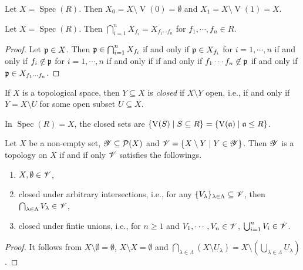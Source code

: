 \begin{fact}
    Let $X = \operatorname{Spec}(R)$. Then $X_0 = X \setminus \operatorname{V}(0) = \emptyset$ and $X_1 = X \setminus \operatorname{V}(1) = X$.
\end{fact}

\begin{proposition}
    Let $X = \operatorname{Spec}(R)$. Then $\bigcap_{i=1}^n X_{f_i} = X_{f_1 \cdots f_n}$ for $f_1,\cdots,f_n \in R$.
\end{proposition}

\begin{proof}
    Let $\mathfrak{p} \in X$. Then $\mathfrak{p} \in \bigcap_{i=1}^n X_{f_i}$ if and only if $\mathfrak{p} \in X_{f_i}$ for $i = 1,\cdots,n$ if and only if $f_i \not \in \mathfrak{p}$ for $i = 1,\cdots,n$ if and only if if and only if $f_1 \cdots f_n \not \in \mathfrak{p}$ if and only if $\mathfrak{p} \in X_{f_1 \cdots f_n}$.
\end{proof}

\begin{definition}
    If $X$ is a topological space, then $Y \subseteq X$ is \emph{closed} if $X \setminus Y$ open, i.e., if and only if $Y = X \setminus U$ for some open subset $U \subseteq X$.
\end{definition}

\begin{example}
    In $\operatorname{Spec}(R) = X$, the closed sets are $\{\operatorname{V}(S) \mid S \subseteq R\} = \{\operatorname{V}(\mathfrak{a}) \mid \mathfrak{a} \leq R\}$.
\end{example}

\begin{proposition}
    Let $X$ be a non-empty set, $\mathscr{Y} \subseteq \mathcal{P}(X)$ and $\mathscr{V} = \{X \setminus Y \mid Y \in \mathscr{Y}\}$. Then $\mathscr{Y}$ is a topology on $X$ if and if only $\mathscr{V}$ satisfies the followings.
    \begin{enumerate}
        \item $X,\emptyset \in \mathscr{V}$,
        \item closed under arbitrary intersections, i.e., for any $\{V_\lambda\}_{\lambda \in \Lambda} \subseteq \mathscr{V}$, then $\bigcap_{\lambda \in \Lambda} V_\lambda \in \mathscr{V}$,
        \item closed under fintie unions, i.e., for $n \geq 1$ and $V_1,\cdots,V_n \in \mathscr{V}$, $\bigcup_{i=1}^n V_i \in \mathscr{V}$.
    \end{enumerate}
\end{proposition}

\begin{proof}
    It follows from $X \setminus \emptyset = \emptyset$, $X \setminus X = \emptyset$ and $\bigcap_{\lambda \in \Lambda} (X \setminus U_\lambda) = X \setminus (\bigcup_{\lambda \in \Lambda} U_\lambda)$.
\end{proof}


